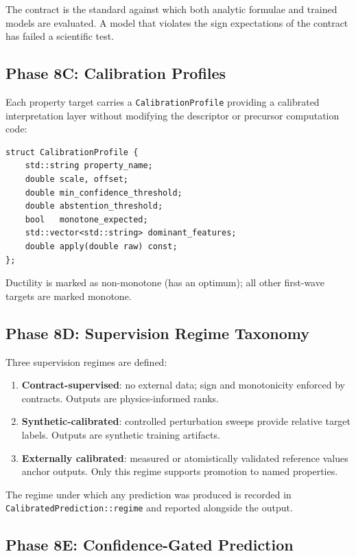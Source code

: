 \documentclass[11pt]{article}
\newcommand{\type}[1]{\texttt{#1}}
\begin{document}
The contract is the standard against which both analytic formulae and
trained models are evaluated.  A model that violates the sign expectations
of the contract has failed a scientific test.

\subsection{Phase 8C: Calibration Profiles}

Each property target carries a \type{CalibrationProfile} providing a
calibrated interpretation layer without modifying the descriptor or
precursor computation code:

\begin{lstlisting}
struct CalibrationProfile {
    std::string property_name;
    double scale, offset;
    double min_confidence_threshold;
    double abstention_threshold;
    bool   monotone_expected;
    std::vector<std::string> dominant_features;
    double apply(double raw) const;
};
\end{lstlisting}

Ductility is marked as non-monotone (has an optimum); all other first-wave
targets are marked monotone.

\subsection{Phase 8D: Supervision Regime Taxonomy}

Three supervision regimes are defined:

\begin{enumerate}
  \item \textbf{Contract-supervised}: no external data; sign and monotonicity
        enforced by contracts.  Outputs are physics-informed ranks.
  \item \textbf{Synthetic-calibrated}: controlled perturbation sweeps provide
        relative target labels.  Outputs are synthetic training artifacts.
  \item \textbf{Externally calibrated}: measured or atomistically validated
        reference values anchor outputs.  Only this regime supports promotion
        to named properties.
\end{enumerate}

The regime under which any prediction was produced is recorded in
\type{CalibratedPrediction::regime} and reported alongside the output.

\subsection{Phase 8E: Confidence-Gated Prediction}
\end{document}
